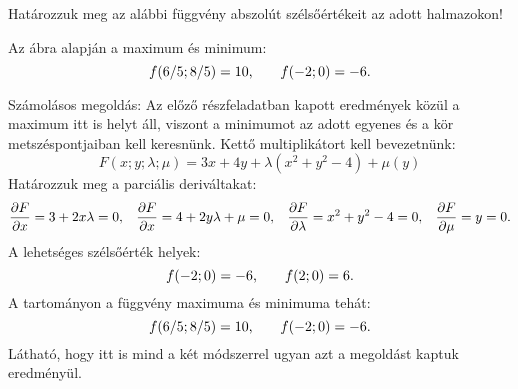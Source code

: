 \begin{exercise}{%
    Határozzuk meg az alábbi függvény abszolút szélsőértékeit az adott
    halmazokon!
  }
{\begin{enumerate}[a)]
\begin{center}
            \end{center}
            Az ábra alapján a maximum és minimum:
            \[
              f(6/5; 8/5) = 10
              \text,\qquad
              f(-2; 0) = -6
              \text.
            \]

            Számolásos megoldás: Az előző részfeladatban kapott eredmények
            közül a maximum itt is helyt áll, viszont a minimumot az adott
            egyenes és a kör metszéspontjaiban kell keresnünk. Kettő
            multiplikátort kell bevezetnünk:
            \[
              F(x; y; \lambda; \mu) = 3x + 4y + \lambda (x^2 + y^2 - 4) + \mu (y)
            \]
            Határozzuk meg a parciális deriváltakat:
            \[
              \pdv{F}{x} = 3 + 2x \lambda = 0
              \text, \quad
              \pdv{F}{x} = 4 + 2y \lambda + \mu = 0
              \text, \quad
              \pdv{F}{\lambda} = x^2 + y^2 - 4 = 0
              \text, \quad
              \pdv{F}{\mu} = y = 0
              \text.
            \]
            A lehetséges szélsőérték helyek:
            \[
              f(-2;0) = -6
              \text,
              \qquad
              f(2;0) = 6
              \text.
            \]
            A tartományon a függvény maximuma és minimuma tehát:
            \[
              f(6/5; 8/5) = 10
              \text,\qquad
              f(-2; 0) = -6
              \text.
            \]
            Látható, hogy itt is mind a két módszerrel ugyan azt a megoldást
            kaptuk eredményül.
    \end{enumerate}
  }
\end{exercise}
